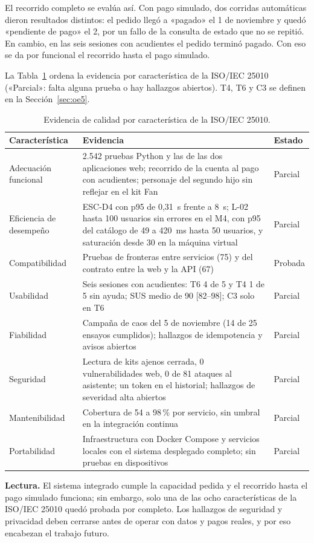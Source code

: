 El recorrido completo se evalúa así. Con pago simulado, dos corridas
automáticas dieron resultados distintos: el pedido llegó a «pagado» el 1 de noviembre y quedó «pendiente
de pago» el 2, por un fallo de la consulta de estado que no se repitió. En cambio, en las seis sesiones
con acudientes el pedido terminó pagado. Con eso se da por funcional el recorrido hasta el pago simulado.

La Tabla~\ref{tab:iso25010} ordena la evidencia por característica de la ISO/IEC 25010 («Parcial»: falta
alguna prueba o hay hallazgos abiertos). T4, T6 y C3 se definen en la Sección~\ref{sec:oe5}.

\begin{table}[htbp]
\centering
\scriptsize
\caption{Evidencia de calidad por característica de la ISO/IEC 25010.}
\label{tab:iso25010}
\begin{tabularx}{\textwidth}{@{}lXl@{}}
\toprule
Característica & Evidencia & Estado \\
\midrule
Adecuación funcional & 2.542 pruebas Python y las de las dos aplicaciones web; recorrido de la cuenta al pago con acudientes; personaje del segundo hijo sin reflejar en el kit Fan & Parcial \\
Eficiencia de desempeño & ESC-D4 con p95 de 0,31~s frente a 8~s; L-02 hasta 100 usuarios sin errores en el M4, con p95 del catálogo de 49 a 420~ms hasta 50 usuarios, y saturación desde 30 en la máquina virtual & Parcial \\
Compatibilidad & Pruebas de fronteras entre servicios (75) y del contrato entre la web y la API (67) & Probada \\
Usabilidad & Seis sesiones con acudientes: T6 4 de 5 y T4 1 de 5 sin ayuda; SUS medio de 90 [82--98]; C3 solo en T6 & Parcial \\
Fiabilidad & Campaña de caos del 5 de noviembre (14 de 25 ensayos cumplidos); hallazgos de idempotencia y avisos abiertos & Parcial \\
Seguridad & Lectura de kits ajenos cerrada, 0 vulnerabilidades web, 0 de 81 ataques al asistente; un token en el historial; hallazgos de severidad alta abiertos & Parcial \\
Mantenibilidad & Cobertura de 54 a 98\,\% por servicio, sin umbral en la integración continua & Parcial \\
Portabilidad & Infraestructura con Docker Compose y servicios locales con el sistema desplegado completo; sin pruebas en dispositivos & Parcial \\
\bottomrule
\end{tabularx}
\end{table}

\textbf{Lectura.} El sistema integrado cumple la capacidad pedida y el recorrido hasta el pago simulado
funciona; sin embargo, solo una de las ocho características de la ISO/IEC 25010 quedó probada por
completo. Los hallazgos de seguridad y privacidad deben cerrarse antes de operar con datos y pagos
reales, y por eso encabezan el trabajo futuro.
